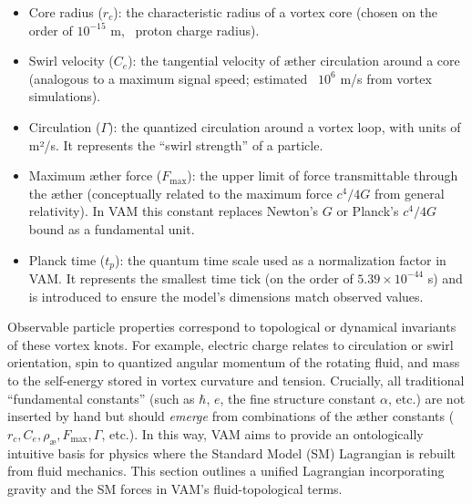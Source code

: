 \begin{itemize}

\item 
Core radius ($r_c$): the characteristic radius of a vortex core (chosen on the order of $10^{-15}$ m, ~proton charge radius).




\item 
Swirl velocity ($C_e$): the tangential velocity of æther circulation around a core (analogous to a maximum signal speed; estimated ~$10^6$ m/s from vortex simulations).




\item 
Circulation ($\Gamma$): the quantized circulation around a vortex loop, with units of m²/s. It represents the “swirl strength” of a particle.




\item 
Maximum æther force ($F_{\text{max}}$): the upper limit of force transmittable through the æther (conceptually related to the maximum force $c^4/4G$ from general relativity). In VAM this constant replaces Newton’s $G$ or Planck’s $c^4/4G$ bound as a fundamental unit.




\item 
Planck time ($t_p$): the quantum time scale used as a normalization factor in VAM. It represents the smallest time tick (on the order of $5.39\times10^{-44}$ s) and is introduced to ensure the model’s dimensions match observed values.




\end{itemize}

Observable particle properties correspond to topological or dynamical invariants of these vortex knots. For example, electric charge relates to circulation or swirl orientation, spin to quantized angular momentum of the rotating fluid, and mass to the self-energy stored in vortex curvature and tension. Crucially, all traditional “fundamental constants” (such as $\hbar$, $e$, the fine structure constant $\alpha$, etc.) are not inserted by hand but should \textit{emerge} from combinations of the æther constants ($r_c, C_e, \rho_{æ}, F_{\text{max}}, \Gamma$, etc.). In this way, VAM aims to provide an ontologically intuitive basis for physics where the Standard Model (SM) Lagrangian is rebuilt from fluid mechanics. This section outlines a unified Lagrangian incorporating gravity and the SM forces in VAM’s fluid-topological terms.


